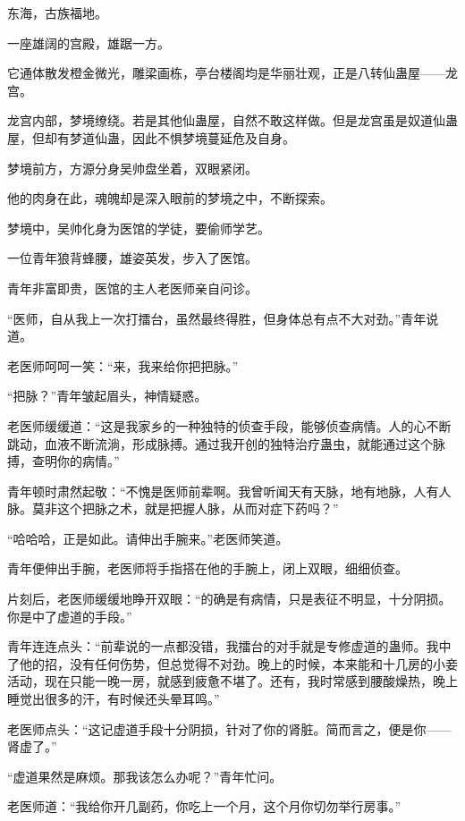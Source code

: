 
\begin{this_body}



东海，古族福地。

一座雄阔的宫殿，雄踞一方。

它通体散发橙金微光，雕梁画栋，亭台楼阁均是华丽壮观，正是八转仙蛊屋——龙宫。

龙宫内部，梦境缭绕。若是其他仙蛊屋，自然不敢这样做。但是龙宫虽是奴道仙蛊屋，但却有梦道仙蛊，因此不惧梦境蔓延危及自身。

梦境前方，方源分身吴帅盘坐着，双眼紧闭。

他的肉身在此，魂魄却是深入眼前的梦境之中，不断探索。

梦境中，吴帅化身为医馆的学徒，要偷师学艺。

一位青年狼背蜂腰，雄姿英发，步入了医馆。

青年非富即贵，医馆的主人老医师亲自问诊。

“医师，自从我上一次打擂台，虽然最终得胜，但身体总有点不大对劲。”青年说道。

老医师呵呵一笑：“来，我来给你把把脉。”

“把脉？”青年皱起眉头，神情疑惑。

老医师缓缓道：“这是我家乡的一种独特的侦查手段，能够侦查病情。人的心不断跳动，血液不断流淌，形成脉搏。通过我开创的独特治疗蛊虫，就能通过这个脉搏，查明你的病情。”

青年顿时肃然起敬：“不愧是医师前辈啊。我曾听闻天有天脉，地有地脉，人有人脉。莫非这个把脉之术，就是把握人脉，从而对症下药吗？”

“哈哈哈，正是如此。请伸出手腕来。”老医师笑道。

青年便伸出手腕，老医师将手指搭在他的手腕上，闭上双眼，细细侦查。

片刻后，老医师缓缓地睁开双眼：“的确是有病情，只是表征不明显，十分阴损。你是中了虚道的手段。”

青年连连点头：“前辈说的一点都没错，我擂台的对手就是专修虚道的蛊师。我中了他的招，没有任何伤势，但总觉得不对劲。晚上的时候，本来能和十几房的小妾活动，现在只能一晚一房，就感到疲惫不堪了。还有，我时常感到腰酸燥热，晚上睡觉出很多的汗，有时候还头晕耳鸣。”

老医师点头：“这记虚道手段十分阴损，针对了你的肾脏。简而言之，便是你——肾虚了。”

“虚道果然是麻烦。那我该怎么办呢？”青年忙问。

老医师道：“我给你开几副药，你吃上一个月，这个月你切勿举行房事。”


\end{this_body}
